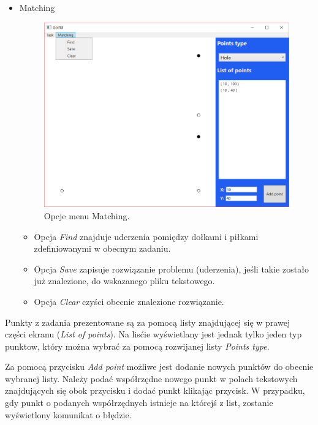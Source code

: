 \documentclass[10pt,a4paper]{article}
\begin{document}
\begin{itemize}
		\item{Matching}
			\begin{figure}[H]
				\centering	
		 			\includegraphics[scale=0.6]{images/matching.png}
		 			\caption{Opcje menu Matching.}
		 		\label{fig:menu_matching}
			\end{figure}	
			
			\begin{itemize}
				\item Opcja \textit{Find} znajduje uderzenia pomiędzy dołkami i piłkami zdefiniowanymi w obecnym zadaniu.
				\item Opcja \textit{Save} zapisuje rozwiązanie problemu (uderzenia), jeśli takie zostało już znalezione, do wskazanego pliku tekstowego.
				\item Opcja \textit{Clear} czyści obecnie znalezione rozwiązanie.
			\end{itemize}
	\end{itemize}
	
	Punkty z zadania prezentowane są za pomocą listy znajdującej się w prawej części ekranu (\textit{List of points}). Na lisćie wyświetlany jest jednak tylko jeden typ punktow, który można wybrać za pomocą rozwijanej listy \textit{Points type}.
		
	Za pomocą przycisku \textit{Add point} możliwe jest dodanie nowych punktów do obecnie wybranej listy. Należy podać współrzędne nowego punkt w polach tekstowych znajdujących się obok przycisku i dodać punkt klikając przycisk. W przypadku, gdy punkt o podanych współrzędnych istnieje na którejś z list, zostanie wyświetlony komunikat o błędzie. 
	
\end{document}
